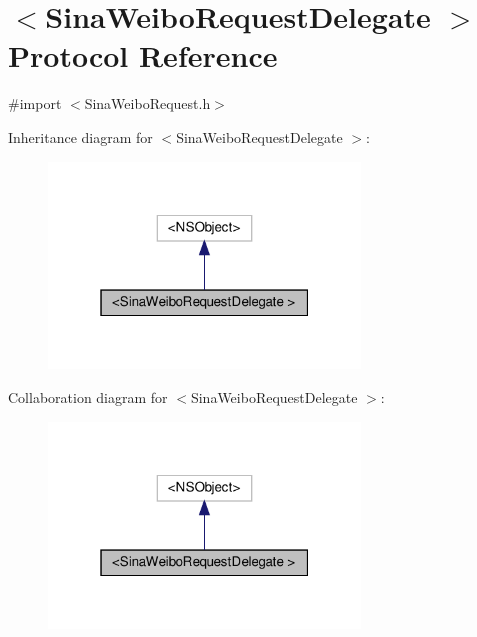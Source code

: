 \hypertarget{protocolSinaWeiboRequestDelegate_01-p}{}\section{$<$Sina\+Weibo\+Request\+Delegate $>$ Protocol Reference}
\label{protocolSinaWeiboRequestDelegate_01-p}


{\ttfamily \#import $<$Sina\+Weibo\+Request.\+h$>$}



Inheritance diagram for $<$Sina\+Weibo\+Request\+Delegate $>$\+:
\nopagebreak
\begin{figure}[H]
\begin{center}
\leavevmode
\includegraphics[width=235pt]{protocolSinaWeiboRequestDelegate_01-p__inherit__graph}
\end{center}
\end{figure}


Collaboration diagram for $<$Sina\+Weibo\+Request\+Delegate $>$\+:
\nopagebreak
\begin{figure}[H]
\begin{center}
\leavevmode
\includegraphics[width=235pt]{protocolSinaWeiboRequestDelegate_01-p__coll__graph}
\end{center}
\end{figure}
